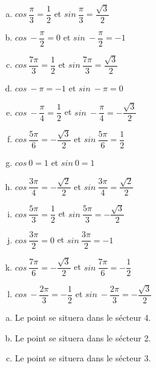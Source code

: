 \documentclass[12pt]{book}
\begin{document}
\begin{Exercise}[number={59}]
    \begin{enumerate}[a)]
        \item $cos{\ \dfrac{\pi}{3}}=\dfrac{1}{2}$ \quad et \quad $sin{\ \dfrac{\pi}{3}}=\dfrac{\sqrt{3}}{2}$
        \item $cos{\ -\dfrac{\pi}{2}}=0$ \quad et \quad $sin{\ -\dfrac{\pi}{2}}=-1$
        \item $cos{\ \dfrac{7\pi}{3}}=\dfrac{1}{2}$ \quad et \quad $sin{\ \dfrac{7\pi}{3}}=\dfrac{\sqrt{3}}{2}$
        \item $cos{\ -\pi}=-1$ \quad et \quad $sin{\ -\pi}=0$
        \item $cos{\ -\dfrac{\pi}{4}}=\dfrac{1}{2}$ \quad et \quad $sin{\ -\dfrac{\pi}{4}}=-\dfrac{\sqrt{3}}{2}$
        \item $cos{\ \dfrac{5\pi}{6}}=-\dfrac{\sqrt{3}}{2}$ \quad et \quad $sin{\ \dfrac{5\pi}{6}}=\dfrac{1}{2}$
        \item $cos{\ 0}=1$ \quad et \quad $sin{\ 0}=1$
        \item $cos{\ \dfrac{3\pi}{4}}=-\dfrac{\sqrt{2}}{2}$ \quad et \quad $sin{\ \dfrac{3\pi}{4}}=\dfrac{\sqrt{2}}{2}$
        \item $cos{\ \dfrac{5\pi}{3}}=\dfrac{1}{2}$ \quad et \quad $sin{\ \dfrac{5\pi}{3}}=-\dfrac{\sqrt{3}}{2}$
        \item $cos{\ \dfrac{3\pi}{2}}=0$ \quad et \quad $sin{\ \dfrac{3\pi}{2}}=-1$
        \item $cos{\ \dfrac{7\pi}{6}}=-\dfrac{\sqrt{3}}{2}$ \quad et \quad $sin{\ \dfrac{7\pi}{6}}=-\dfrac{1}{2}$
        \item $cos{\ -\dfrac{2\pi}{3}}=-\dfrac{1}{2}$ \quad et \quad $sin{\ -\dfrac{2\pi}{3}}=-\dfrac{\sqrt{3}}{2}$
    \end{enumerate}
\end{Exercise}

\begin{Exercise}[number={60}]
    \begin{enumerate}[a)]
        \item Le point se situera dans le sécteur 4.
        \item Le point se situera dans le sécteur 2.
        \item Le point se situera dans le sécteur 3.
    \end{enumerate}
\end{Exercise}
\end{document}
